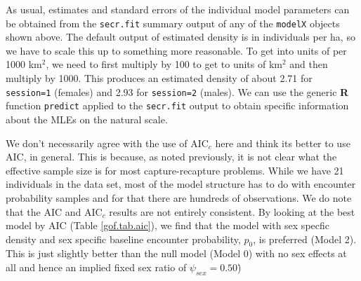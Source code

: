 {{}
As usual, estimates and standard errors of the individual model
parameters can be obtained from the \mbox{\tt secr.fit} summary output
of any of the \mbox{\tt modelX} objects shown above.
The default output of estimated density is in individuals per ha, so
we have to scale this up to something more reasonable. To get into
units of per 1000 km$^2$, we need to first multiply by 100 to get to units of
km$^2$ and then multiply by 1000. This produces an estimated density of
about 2.71 for \mbox{\tt session=1} (females) and 2.93 for
\mbox{\tt session=2} (males).  We can use the generic {\bf R} function
\mbox{\tt predict} applied to the \mbox{\tt secr.fit} output to obtain
 specific information about the MLEs on the natural scale.

 We don't necessarily agree with the use of AIC$_c$ here and think its
 better to use AIC, in general. This is because, as noted previously,
 it is not clear what the effective sample size is for most
 capture-recapture problems. While we have 21 individuals in the data
 set, most of the model structure has to do with encounter probability
 samples and for that there are hundreds of observations. We do note
 that the AIC and AIC$_c$ results are not entirely consistent.  By
 looking at the best model by AIC (Table \ref{gof.tab.aic}), we find
 that the model with sex specfic density and sex specific baseline
 encounter probability, $p_{0}$, is preferred (Model 2). This is just
 slightly better than the null model (Model 0) with no sex effects at all
 and hence an implied fixed sex ratio of $\psi_{sex} = 0.50$)\.


}
